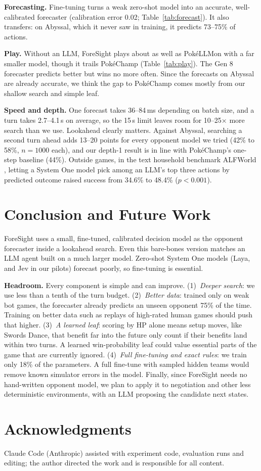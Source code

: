 \documentclass[letterpaper]{article} %
\begin{document}
\textbf{Forecasting.} Fine-tuning turns a weak zero-shot model into an accurate, well-calibrated forecaster (calibration error 0.02; Table~\ref{tab:forecast}). It also transfers: on Abyssal, which it never saw in training, it predicts 73--75\% of actions.

\textbf{Play.} Without an LLM, ForeSight plays about as well as PokéLLMon with a far smaller model, though it trails PokéChamp (Table~\ref{tab:play}). The Gen 8 forecaster predicts better but wins no more often. Since the forecasts on Abyssal are already accurate, we think the gap to PokéChamp comes mostly from our shallow search and simple leaf.

\textbf{Speed and depth.} One forecast takes 36--84\,ms depending on batch size, and a turn takes 2.7--4.1\,s on average, so the 15\,s limit leaves room for 10--25$\times$ more search than we use. Lookahead clearly matters. Against Abyssal, searching a second turn ahead adds 13--20 points for every opponent model we tried (42\% to 58\%, $n{=}1000$ each), and our depth-1 result is in line with PokéChamp's one-step baseline (44\%). Outside games, in the text household benchmark ALFWorld \citep{alfworld}, letting a System One model pick among an LLM's top three actions by predicted outcome raised success from 34.6\% to 48.4\% ($p{<}0.001$).

\section{Conclusion and Future Work}
ForeSight uses a small, fine-tuned, calibrated decision model as the opponent forecaster inside a lookahead search. Even this bare-bones version matches an LLM agent built on a much larger model. Zero-shot System One models (Laya, and Jev in our pilots) forecast poorly, so fine-tuning is essential.

\textbf{Headroom.} Every component is simple and can improve.
(1)~\emph{Deeper search}: we use less than a tenth of the turn budget.
(2)~\emph{Better data}: trained only on weak bot games, the forecaster already predicts an unseen opponent 75\% of the time. Training on better data such as replays of high-rated human games \citep{metamon} should push that higher.
(3)~\emph{A learned leaf}: scoring by HP alone means setup moves, like Swords Dance, that benefit far into the future only count if their benefits land within two turns. A learned win-probability leaf could value essential parts of the game that are currently ignored.
(4)~\emph{Full fine-tuning and exact rules}: we train only 18\% of the parameters. A full fine-tune with sampled hidden teams would remove known simulator errors in the model.
Finally, since ForeSight needs no hand-written opponent model, we plan to apply it to negotiation \citep{dealornodeal} and other less deterministic environments, with an LLM proposing the candidate next states.

\section*{Acknowledgments}
Claude Code (Anthropic) assisted with experiment code, evaluation runs and editing; the author directed the work and is responsible for all content.


\end{document}
